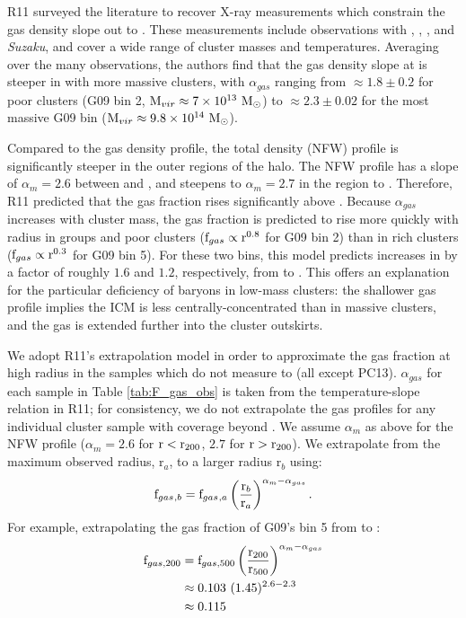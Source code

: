 R11 surveyed the literature to recover X-ray measurements which
constrain the gas density slope out to \rfive{}. These measurements
include observations with \Rosat{}, \Chandra, \XMM, and
\textit{Suzaku}, and cover a wide range of cluster masses and
temperatures. Averaging over the many observations, the authors find
that the gas density slope at \rfive{} is steeper in with more massive
clusters, with $\alpha_{gas}$ ranging from $\approx 1.8 \pm 0.2$ for
poor clusters (G09 bin 2, $\textrm{M\ensuremath{_{vir}}} \approx 7\times 10^{13}~\textrm{M}_\odot$) to
$\approx 2.3 \pm 0.02$ for the most massive G09 bin ($\textrm{M\ensuremath{_{vir}}}
\approx9.8\times 10^{14}~\textrm{M}_\odot$). 

Compared to the gas density profile, the total density (NFW) profile
is significantly steeper in the outer regions of the halo. The NFW
profile has a slope of $\alpha_m = 2.6$ between \rfive{} and \rtwo{},
and steepens to $\alpha_m = 2.7$ in the region \rtwo{} to
\rvir{}. Therefore, R11 predicted that the gas fraction rises
significantly above \rfive{}. Because $\alpha_{gas}$ increases with
cluster mass, the gas fraction is predicted to rise more quickly with
radius in groups and poor clusters ($\textrm{f\ensuremath{_{gas}}}\propto \textrm{r}^{0.8}$ for
G09 bin 2) than in rich clusters ($\textrm{f\ensuremath{_{gas}}} \propto \textrm{r}^{0.3}$ for
G09 bin 5). For these two bins, this model predicts increases in \fg{}
by a factor of roughly $1.6$ and $1.2$, respectively, from \rfive{} to
\rvir{}. This offers an explanation for the particular deficiency of
baryons in low-mass clusters: the shallower gas profile implies the
ICM is less centrally-concentrated than in massive clusters, and the
gas is extended further into the cluster outskirts.

We adopt R11's extrapolation model in order to approximate the gas
fraction at high radius in the samples which do not measure \fg{} to
\rvir{} (all except PC13). $\alpha_{gas}$ for each sample in Table
\ref{tab:F_gas_obs} is taken from the temperature-slope relation in
R11; for consistency, we do not extrapolate the gas profiles for any
individual cluster sample with coverage beyond \rfive{}. We assume
$\alpha_m$ as above for the NFW profile ($\alpha_m = 2.6$ for
$\textrm{r}<\textrm{r\ensuremath{_{200}}}$, $2.7$ for $\textrm{r}>\textrm{r\ensuremath{_{200}}}$). We extrapolate \fg{} from the
maximum observed radius, r$_a$, to a larger radius r$_b$ using:
\begin{equation}
\textrm{f\ensuremath{_{gas}}}{}_{,b} =
\textrm{f\ensuremath{_{gas}}}{}_{,a}\left(\frac{\textrm{r}_b}{\textrm{r}_a}\right)^{\alpha_m - \alpha_{gas}}.
\end{equation}
 For example, extrapolating the gas fraction of G09's bin 5 from \rfive{} to \rtwo{}:
\begin{align}
\textrm{f\ensuremath{_{gas,200}}} &= \textrm{f\ensuremath{_{gas,500}}}\left(\frac{\textrm{r\ensuremath{_{200}}}}{\textrm{r\ensuremath{_{500}}}}\right)^{\alpha_m -
  \alpha_{gas}} \nonumber\\ &\approx 0.103~(1.45)^{2.6 - 2.3} \nonumber
\\ &\approx 0.115 \nonumber
\end{align}

